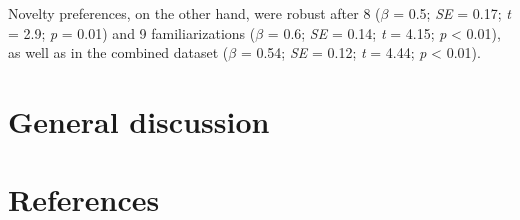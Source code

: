 \documentclass[10pt, letterpaper]{article}
\begin{document}
Novelty preferences, on the other hand, were robust after 8 (\(\beta\) =
0.5; \emph{SE} = 0.17; \emph{t} = 2.9; \emph{p} = 0.01) and 9
familiarizations (\(\beta\) = 0.6; \emph{SE} = 0.14; \emph{t} = 4.15;
\emph{p} \textless{} 0.01), as well as in the combined dataset
(\(\beta\) = 0.54; \emph{SE} = 0.12; \emph{t} = 4.44; \emph{p}
\textless{} 0.01).

\hypertarget{general-discussion}{%
\section{General discussion}\label{general-discussion}}

\hypertarget{references}{%
\section{References}\label{references}}

\setlength{\parindent}{-0.1in} 
\setlength{\leftskip}{0.125in}

\noindent


\end{document}
